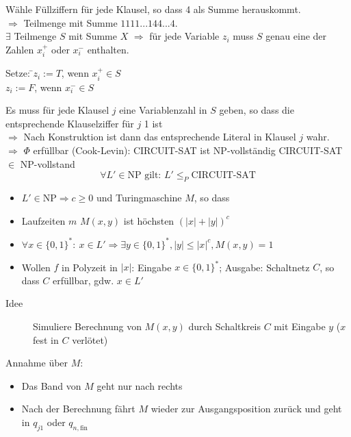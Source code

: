 Wähle Füllziffern für jede Klausel, so dass 4 als Summe herauskommt.\\
$\Rightarrow$ Teilmenge mit Summe $1111...144...4.$ \\
$\exists$ Teilmenge $S$ mit Summe $X$ $\Rightarrow$ für jede Variable $z_i$ muss $S$ genau eine der Zahlen $x_i^+$ oder $x_i^-$ enthalten.
\begin{tabbing}
Setze: \=$z_i := T$, wenn $x_i^+ \in S$ \\
       \>$z_i := F$, wenn $x_i^- \in S$
\end{tabbing}
Es muss für jede Klausel $j$ eine Variablenzahl in $S$ geben, so dass die entsprechende Klauselziffer für $j$ 1 ist\\
$\Rightarrow$ Nach Konstruktion ist dann das entsprechende Literal in Klausel $j$ wahr. \\
$\Rightarrow$ $\Phi$ erfüllbar
\Satz (Cook-Levin): CIRCUIT-SAT ist NP-vollständig
\Bew CIRCUIT-SAT $\in$ NP-vollstand\\
\[\forall L' \in \text{NP gilt: }L' \leq_P \text{CIRCUIT-SAT}\]
\begin{itemize}
 \item $L' \in \text{NP} \Rightarrow c \geq 0$ und Turingmaschine $M$, so dass
 \item Laufzeiten $m$ $M(x,y)$ ist höchsten $(|x| + |y|)^c$
 \item $\forall x \in \{0,1\}^*{:}\ x \in L' \Rightarrow \exists y \in \{0,1\}^*, |y| \leq |x|^c, M(x,y) = 1$
 \item Wollen $f$ in Polyzeit in $|x|$: Eingabe $x \in \{0,1\}^*$; Ausgabe: Schaltnetz $C$, so dass $C$ erfüllbar, gdw. $x \in L'$
\end{itemize}
\begin{description}
 \item[Idee] Simuliere Berechnung von $M(x,y)$ durch Schaltkreis $C$ mit Eingabe $y$ ($x$ fest in $C$ verlötet)
\end{description}
Annahme über $M$:
\begin{itemize}
 \item Das Band von $M$ geht nur nach rechts
 \item Nach der Berechnung fährt $M$ wieder zur Ausgangsposition zurück und geht in $q_{j1}$ oder $q_{n,\text{fin}}$
\end{itemize}
